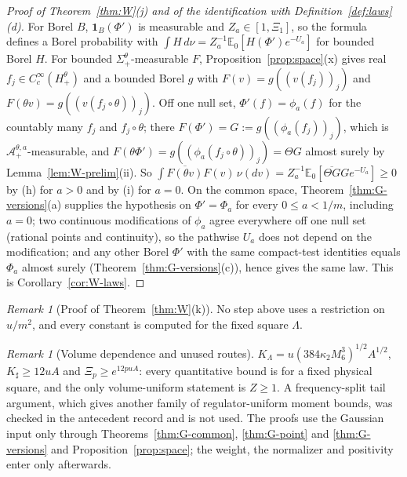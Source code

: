 \documentclass[11pt]{article}
\theoremstyle{plain}
\theoremstyle{definition}
\theoremstyle{remark}
\newtheorem{remark}[theorem]{Remark}
\newcommand{\E}{\mathbb{E}}
\newcommand{\cA}{\mathcal{A}}
\newcommand{\ind}{\mathbf{1}}
\newcommand{\conj}[1]{\overline{#1}}
\begin{document}
\begin{proof}[Proof of Theorem~\ref{thm:W}(j) and of the identification with Definition~\ref{def:laws}(d)]
For Borel $B$, $\ind_B(\Phi')$ is measurable and $Z_a\in[1,\Xi_1]$, so the formula defines a Borel
probability with $\int H\,d\nu=Z_a^{-1}\E_0[H(\Phi')e^{-U_a}]$ for bounded Borel $H$. For bounded
$\Sigma^{\theta}_{+}$-measurable $F$, Proposition~\ref{prop:space}(x) gives real
$f_j\in C_c^{\infty}(H^{\theta}_{+})$ and a bounded Borel $g$ with $F(v)=g((v(f_j))_j)$ and
$F(\theta v)=g((v(f_j\circ\theta))_j)$. Off one null set, $\Phi'(f)=\phi_a(f)$ for the countably many $f_j$
and $f_j\circ\theta$; there $F(\Phi')=G:=g((\phi_a(f_j))_j)$, which is $\cA^{\theta,a}_{+}$-measurable, and
$F(\theta\Phi')=g((\phi_a(f_j\circ\theta))_j)=\Theta G$ almost surely by Lemma~\ref{lem:W-prelim}(ii). So
$\int\conj{F(\theta v)}F(v)\,\nu(dv)=Z_a^{-1}\E_0[\conj{\Theta G}Ge^{-U_a}]\ge0$ by (h) for $a>0$ and by (i) for $a=0$.
On the common space, Theorem~\ref{thm:G-versions}(a) supplies the hypothesis on
$\Phi'=\Phi_a$ for every $0\le a<1/m$, including $a=0$; two continuous modifications of
$\phi_a$ agree everywhere off one null set (rational points and continuity), so the
pathwise $U_a$ does not depend on the modification; and any other Borel $\Phi'$ with
the same compact-test identities equals $\Phi_a$ almost surely
(Theorem~\ref{thm:G-versions}(c)), hence gives the same law. This is
Corollary~\ref{cor:W-laws}.
\end{proof}

\begin{remark}[Proof of Theorem~\ref{thm:W}(k)]
No step above uses a restriction on $u/m^{2}$, and every constant is computed for
the fixed square $\Lambda$.
\end{remark}

\begin{remark}[Volume dependence and unused routes]\label{rem:W-proofscope}
$K_\Lambda=u(384\kappa_2M_6^{3})^{1/2}A^{1/2}$, $K_\sharp\ge12uA$ and $\Xi_p\ge e^{12puA}$: every quantitative bound is
for a fixed physical square, and the only volume-uniform statement is $Z\ge1$.
A frequency-split tail argument, which gives another family of
regulator-uniform moment bounds, was checked in the antecedent record and is not
used. The proofs use the Gaussian input only through
Theorems~\ref{thm:G-common}, \ref{thm:G-point} and \ref{thm:G-versions} and
Proposition~\ref{prop:space}; the weight, the normalizer and positivity enter
only afterwards.
\end{remark}
\end{document}
